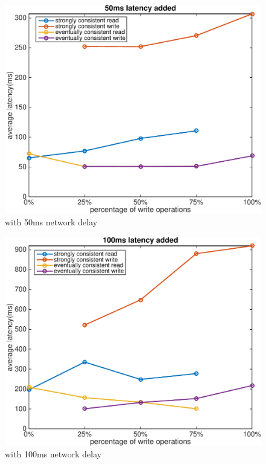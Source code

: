 \begin{figure}[hbt]
\centering
\includegraphics[width=\linewidth]{figures/latency_50.pdf}
\caption{with 50ms network delay}
\label{fig:latency_50}
\end{figure}

\begin{figure}[hbt]
\centering
\includegraphics[width=\linewidth]{figures/latency_100.pdf}
\caption{with 100ms network delay}
\label{fig:latency_100}
\end{figure}
\vspace{-2mm}


